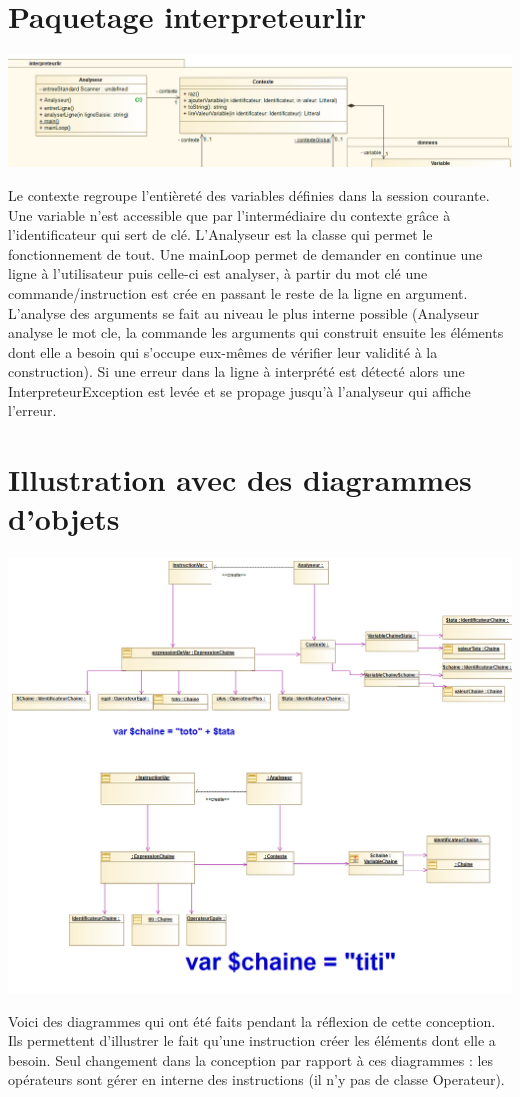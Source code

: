 \section{Paquetage interpreteurlir}
\includegraphics[scale=0.60]{./img/COO/COO_prototype_1/PackageInterpreteurlir}
\par Le contexte regroupe l'entièreté des variables définies dans la session courante. Une variable n'est accessible que par l'intermédiaire du contexte grâce à l'identificateur qui sert de clé. L'Analyseur est la classe qui permet le fonctionnement de tout. Une mainLoop permet de demander en continue une ligne à l'utilisateur puis celle-ci est analyser, à partir du mot clé une commande/instruction est crée en passant le reste de la ligne en argument. L'analyse des arguments se fait au niveau le plus interne possible (Analyseur analyse le mot cle, la commande les arguments qui construit ensuite les éléments dont elle a besoin qui s'occupe eux-mêmes de vérifier leur validité à la construction). Si une erreur dans la ligne à interprété est détecté alors une InterpreteurException est levée et se propage jusqu'à l'analyseur qui affiche l'erreur.

\section{Illustration avec des diagrammes d'objets}
\includegraphics[scale=0.50]{./img/COO/COO_prototype_1/Objet}
\par Voici des diagrammes qui ont été faits pendant la réflexion de cette conception. Ils permettent d'illustrer le fait qu'une instruction créer les éléments dont elle a besoin. Seul changement dans la conception par rapport à ces diagrammes : les opérateurs sont gérer en interne des instructions (il n'y pas de classe Operateur).